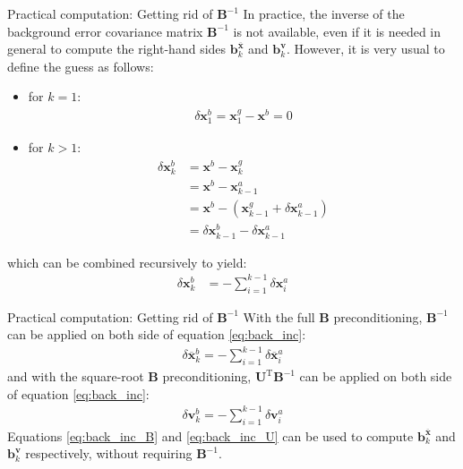 \documentclass[10pt]{beamer}
\begin{document}
\begin{frame}{Practical computation: Getting rid of $\mathbf{B}^{-1}$}
In practice, the inverse of the background error covariance matrix $\mathbf{B}^{-1}$ is not available, even if it is needed in general to compute the right-hand sides $\mathbf{b}^{\overline{\mathbf{x}}}_k$ and $\mathbf{b}^\mathbf{v}_k$. However, it is very usual to define the guess as follows:
\begin{itemize}
\item for $k = 1$:
\begin{align}
\delta \mathbf{x}^b_1 = \mathbf{x}^g_1 - \mathbf{x}^b = 0
\end{align}
\item for $k > 1$:
\begin{align}
\delta \mathbf{x}^b_k & = \mathbf{x}^b - \mathbf{x}^g_k \nonumber \\
& = \mathbf{x}^b - \mathbf{x}^a_{k-1} \nonumber \\
& = \mathbf{x}^b - \left(\mathbf{x}^g_{k-1} + \delta \mathbf{x}^a_{k-1}\right) \nonumber \\
& = \delta \mathbf{x}^b_{k-1} - \delta \mathbf{x}^a_{k-1}
\end{align}
\end{itemize}
which can be combined recursively to yield:
\begin{align}
\label{eq:back_inc}
\delta \mathbf{x}^b_k & = - \sum_{i=1}^{k-1} \delta \mathbf{x}^a_i
\end{align}
\end{frame}

\begin{frame}{Practical computation: Getting rid of $\mathbf{B}^{-1}$}
 With the full $\mathbf{B}$ preconditioning, $\mathbf{B}^{-1}$ can be applied on both side of equation \eqref{eq:back_inc}:
\begin{align}
\label{eq:back_inc_B}
\boxed{\delta \overline{\mathbf{x}}^b_k = - \sum_{i=1}^{k-1} \delta \overline{\mathbf{x}}^a_i}
\end{align}
and with the square-root $\mathbf{B}$ preconditioning, $\mathbf{U}^\mathrm{T} \mathbf{B}^{-1}$ can be applied on both side of equation \eqref{eq:back_inc}:
\begin{align}
\label{eq:back_inc_U}
\boxed{\delta \mathbf{v}^b_k = - \sum_{i=1}^{k-1} \delta \mathbf{v}^a_i}
\end{align}
Equations \eqref{eq:back_inc_B} and \eqref{eq:back_inc_U} can be used to compute $\mathbf{b}^{\overline{\mathbf{x}}}_k$ and $\mathbf{b}^\mathbf{v}_k$ respectively, without requiring $\mathbf{B}^{-1}$.
\end{frame}
\end{document}
